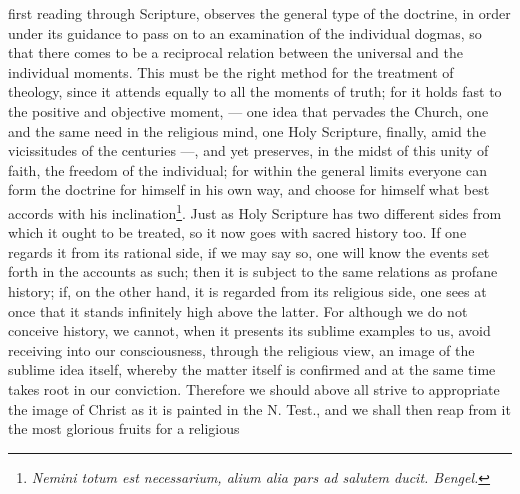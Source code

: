 \documentclass[12pt]{book}
\newcommand{\opage}[1]{\marginnote{\footnotesize\textit{[#1]}}}
\begin{document}
first reading through Scripture, observes the general type of the doctrine, in
order under its guidance to pass on to an examination of the individual
dogmas, so that there comes to be a reciprocal relation between the universal
and the individual moments. This must be the right method for the treatment of
theology, since it attends equally to all the moments of truth; for it holds
fast to the positive and objective moment, --- one idea that pervades the
Church, one and the same need in the religious mind, one Holy Scripture,
finally, amid the vicissitudes of the centuries ---, and yet preserves, in the
midst of this unity of faith, the freedom of the individual; for within the
general limits everyone can form the doctrine for himself in his own way, and
choose for himself what best accords with his
inclination\footnote{\textit{Nemini totum est necessarium, alium alia pars
ad salutem ducit. Bengel.}}.
\opage{102} \setcounter{footnote}{0}%
Just as Holy Scripture has two different sides from which it ought to be
treated, so it now goes with sacred history too. If one regards it from its
rational side, if we may say so, one will know the events set forth in the
accounts as such; then it is subject to the same relations as profane history;
if, on the other hand, it is regarded from its religious side, one sees at once
that it stands infinitely high above the latter. For although we do not
conceive history, we cannot, when it presents its sublime examples to us, avoid
receiving into our consciousness, through the religious view, an image of the
sublime idea itself, whereby the matter itself is confirmed and at the same
time takes root in our conviction. Therefore we should above all strive to
appropriate the image of Christ as it is painted in the N. Test., and we shall
then reap from it the most glorious fruits for a religious
\end{document}
